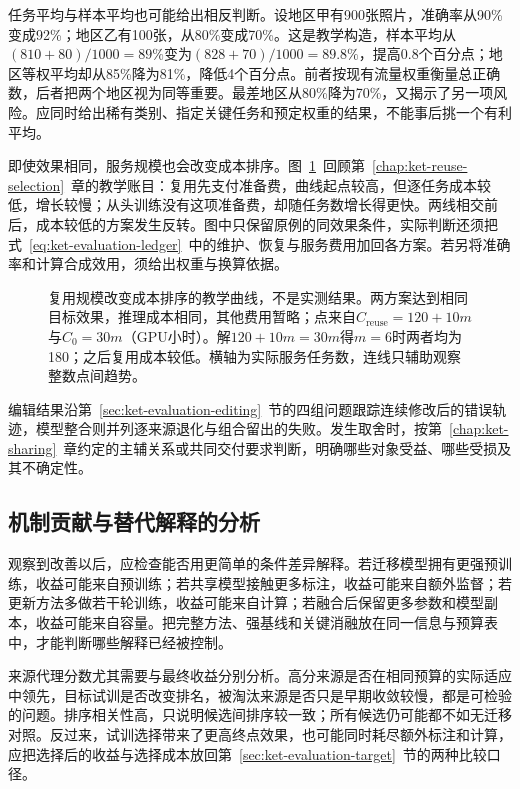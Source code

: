 任务平均与样本平均也可能给出相反判断。设地区甲有900张照片，准确率从90\%变成92\%；地区乙有100张，从80\%变成70\%。这是教学构造，样本平均从$(810+80)/1000=89\%$变为$(828+70)/1000=89.8\%$，提高0.8个百分点；地区等权平均却从85\%降为81\%，降低4个百分点。前者按现有流量权重衡量总正确数，后者把两个地区视为同等重要。最差地区从80\%降为70\%，又揭示了另一项风险。应同时给出稀有类别、指定关键任务和预定权重的结果，不能事后挑一个有利平均。

即使效果相同，服务规模也会改变成本排序。图~\ref{fig:ket-evaluation-utility}~回顾第~\ref{chap:ket-reuse-selection}~章的教学账目：复用先支付准备费，曲线起点较高，但逐任务成本较低，增长较慢；从头训练没有这项准备费，却随任务数增长得更快。两线相交前后，成本较低的方案发生反转。图中只保留原例的同效果条件，实际判断还须把式~\eqref{eq:ket-evaluation-ledger}~中的维护、恢复与服务费用加回各方案。若另将准确率和计算合成效用，须给出权重与换算依据。

\begin{figure}[htbp]
  \centering
  
  \caption{复用规模改变成本排序的教学曲线，不是实测结果。两方案达到相同目标效果，推理成本相同，其他费用暂略；点来自$C_{\mathrm{reuse}}=120+10m$与$C_0=30m$（GPU小时）。解$120+10m=30m$得$m=6$时两者均为180；之后复用成本较低。横轴为实际服务任务数，连线只辅助观察整数点间趋势。}
  \label{fig:ket-evaluation-utility}
\end{figure}

编辑结果沿第~\ref{sec:ket-evaluation-editing}~节的四组问题跟踪连续修改后的错误轨迹，模型整合则并列逐来源退化与组合留出的失败。发生取舍时，按第~\ref{chap:ket-sharing}~章约定的主辅关系或共同交付要求判断，明确哪些对象受益、哪些受损及其不确定性。

\subsection{机制贡献与替代解释的分析}
\label{sec:ket-evaluation-mechanisms}

观察到改善以后，应检查能否用更简单的条件差异解释。若迁移模型拥有更强预训练，收益可能来自预训练；若共享模型接触更多标注，收益可能来自额外监督；若更新方法多做若干轮训练，收益可能来自计算；若融合后保留更多参数和模型副本，收益可能来自容量。把完整方法、强基线和关键消融放在同一信息与预算表中，才能判断哪些解释已经被控制。

来源代理分数尤其需要与最终收益分别分析。高分来源是否在相同预算的实际适应中领先，目标试训是否改变排名，被淘汰来源是否只是早期收敛较慢，都是可检验的问题。排序相关性高，只说明候选间排序较一致；所有候选仍可能都不如无迁移对照。反过来，试训选择带来了更高终点效果，也可能同时耗尽额外标注和计算，应把选择后的收益与选择成本放回第~\ref{sec:ket-evaluation-target}~节的两种比较口径。

